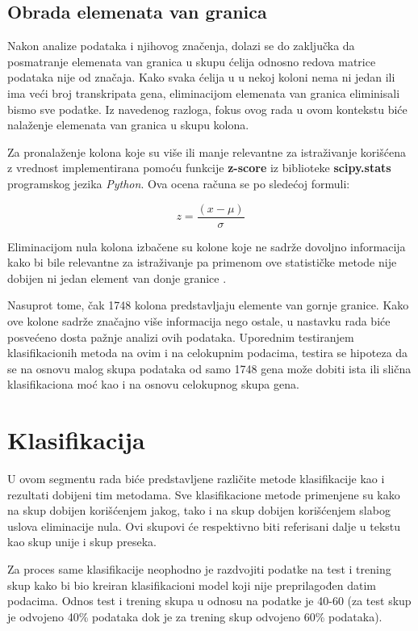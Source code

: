 \documentclass[a4paper]{article}
\begin{document}
\subsection{Obrada elemenata van granica}
\label{outlier}

Nakon analize podataka i njihovog značenja, dolazi se do zaključka da posmatranje elemenata van granica u skupu ćelija odnosno redova matrice podataka nije od značaja. Kako svaka ćelija u u nekoj koloni nema ni jedan ili ima veći broj transkripata gena, eliminacijom elemenata van granica eliminisali bismo sve podatke. Iz navedenog razloga, fokus ovog rada u ovom kontekstu biće nalaženje elemenata van granica u skupu kolona.

Za pronalaženje kolona koje su više ili manje relevantne za istraživanje korišćena z vrednost implementirana pomoću funkcije \textbf{z-score} iz biblioteke \textbf{scipy.stats} programskog jezika \textit{Python}. Ova ocena računa se po sledećoj formuli:

\[ 
z = \frac{(x-\mu)}{\sigma}
\]

Eliminacijom nula kolona izbačene su kolone koje ne sadrže dovoljno informacija kako bi bile relevantne za istraživanje pa primenom ove statističke metode nije dobijen ni jedan element van donje granice \cite{zscore}.

Nasuprot tome, čak 1748 kolona predstavljaju elemente van gornje granice. Kako ove kolone sadrže značajno više informacija nego ostale, u nastavku rada biće posvećeno dosta pažnje analizi ovih podataka. 
Uporednim testiranjem klasifikacionih metoda na ovim i na celokupnim podacima, testira se hipoteza da se na osnovu malog skupa podataka od samo 1748 gena može dobiti ista ili slična klasifikaciona moć kao i na osnovu celokupnog skupa gena.

\newpage

\section{Klasifikacija}
\label{klasifikacija}

U ovom segmentu rada biće predstavljene različite metode klasifikacije kao i rezultati dobijeni tim metodama. Sve klasifikacione metode primenjene su kako na skup dobijen korišćenjem jakog, tako i na skup dobijen korišćenjem slabog uslova eliminacije nula. Ovi skupovi će respektivno biti referisani dalje u tekstu kao skup unije i skup preseka.

Za proces same klasifikacije neophodno je razdvojiti podatke na test i trening skup kako bi bio kreiran klasifikacioni model koji nije preprilagođen datim podacima. 
Odnos test i trening skupa u odnosu na podatke je 40-60 (za test skup je odvojeno 40\% podataka dok je za trening skup odvojeno 60\% podataka).
\end{document}
